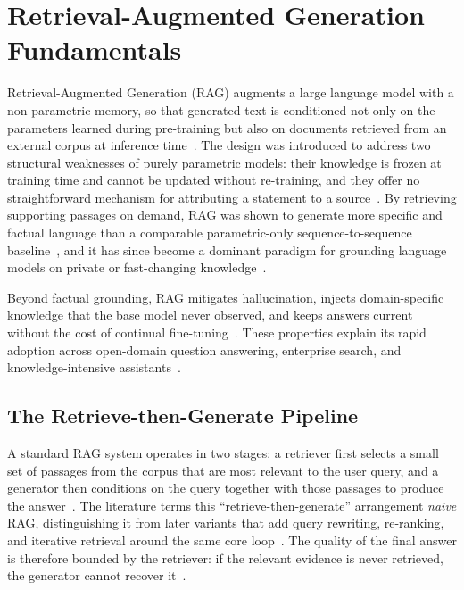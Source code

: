 \section{Retrieval-Augmented Generation Fundamentals}
\label{sec:gr-rag-fundamentals}

Retrieval-Augmented Generation (RAG) augments a large language model with a
non-parametric memory, so that generated text is conditioned not only on the
parameters learned during pre-training but also on documents retrieved from an
external corpus at inference time~\cite{lewis2020rag}. The design was introduced
to address two structural weaknesses of purely parametric models: their
knowledge is frozen at training time and cannot be updated without re-training,
and they offer no straightforward mechanism for attributing a statement to a
source~\cite{lewis2020rag}. By retrieving supporting passages on demand, RAG was
shown to generate more specific and factual language than a comparable
parametric-only sequence-to-sequence baseline~\cite{lewis2020rag}, and it has
since become a dominant paradigm for grounding language models on private or
fast-changing knowledge~\cite{gao2023ragsurvey}.

Beyond factual grounding, RAG mitigates hallucination, injects domain-specific
knowledge that the base model never observed, and keeps answers current without
the cost of continual fine-tuning~\cite{gao2023ragsurvey, peng2024graphrag}.
These properties explain its rapid adoption across open-domain question
answering, enterprise search, and knowledge-intensive
assistants~\cite{gao2023ragsurvey}.

\subsection{The Retrieve-then-Generate Pipeline}

A standard RAG system operates in two stages: a retriever first selects a small
set of passages from the corpus that are most relevant to the user query, and a
generator then conditions on the query together with those passages to produce
the answer~\cite{lewis2020rag}. The literature terms this ``retrieve-then-generate''
arrangement \emph{naive} RAG, distinguishing it from later variants that add
query rewriting, re-ranking, and iterative retrieval around the same core
loop~\cite{gao2023ragsurvey}. The quality of the final answer is therefore
bounded by the retriever: if the relevant evidence is never retrieved, the
generator cannot recover it~\cite{gao2023ragsurvey}.

